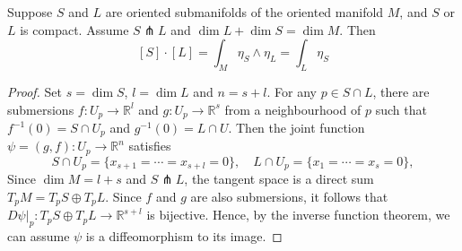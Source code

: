 \begin{thm} \label{thm:intersection_poincare} %
	Suppose $S$ and  $L$ are oriented submanifolds of the 
	oriented manifold  $M$, and $S$ or $L$ is compact.
	Assume  $S \pitchfork L$ and  $\dim L + \dim S = \dim M$.
	Then 
	\[ 
		[S] \cdot [L] = \int_M \eta_S \wedge \eta_L = \int_L \eta_S
	\] 
\end{thm}
\begin{proof}
	Set $s=\dim S$, $l=\dim L$ and $n=s+l$. For any $p\in S\cap L$, there are
	submersions $f : U_p \to \mathbb{R}^l$ and $g:U_p\to \mathbb{R}^s$ from a
	neighbourhood of $p$ such that  $f^{-1}(0) = S \cap U_p$ and $g^{-1}(0) =
	L\cap U$. Then the joint function $\psi=(g,f) : U_p \to \mathbb{R}^n$ satisfies 
	\[
		S\cap U_p = \{x_{s+1}=\cdots=x_{s+l}=0\}, \quad
		L\cap U_p = \{x_{1}=\cdots=x_{s}=0\}, 
	\] 
	Since $\dim M = l + s$ and $S\pitchfork L$, the tangent space is a direct sum 
	$T_pM = T_pS \oplus T_pL$. Since $f$ and  $g$ are also submersions,
	it follows that $D\psi|_p : T_p S \oplus T_p L \to \mathbb{R}^{s+l}$ is 
	bijective. Hence, by the
	inverse function theorem, we can assume $\psi$ is a diffeomorphism to its
	image. 


\end{proof}

